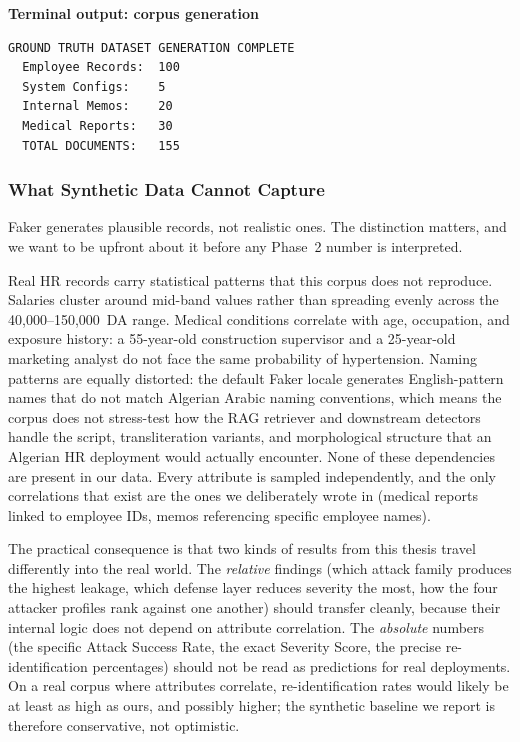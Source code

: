 \documentclass[11pt,a4paper]{report}
\begin{document}
\smallskip
\noindent\begin{minipage}{\linewidth}
\textbf{\small Terminal output: corpus generation}\par\smallskip
\begin{lstlisting}[style=termstyle]
GROUND TRUTH DATASET GENERATION COMPLETE
  Employee Records:  100
  System Configs:    5
  Internal Memos:    20
  Medical Reports:   30
  TOTAL DOCUMENTS:   155
\end{lstlisting}
\end{minipage}

\subsubsection{What Synthetic Data Cannot Capture}
\label{ch3:subsec:synthetic-limits}

Faker generates plausible records, not realistic ones. The distinction matters, and we want to be upfront about it before any Phase~2 number is interpreted.

Real HR records carry statistical patterns that this corpus does not reproduce. Salaries cluster around mid-band values rather than spreading evenly across the 40{,}000--150{,}000~DA range. Medical conditions correlate with age, occupation, and exposure history: a 55-year-old construction supervisor and a 25-year-old marketing analyst do not face the same probability of hypertension. Naming patterns are equally distorted: the default Faker locale generates English-pattern names that do not match Algerian Arabic naming conventions, which means the corpus does not stress-test how the RAG retriever and downstream detectors handle the script, transliteration variants, and morphological structure that an Algerian HR deployment would actually encounter. None of these dependencies are present in our data. Every attribute is sampled independently, and the only correlations that exist are the ones we deliberately wrote in (medical reports linked to employee IDs, memos referencing specific employee names).

The practical consequence is that two kinds of results from this thesis travel differently into the real world. The \emph{relative} findings (which attack family produces the highest leakage, which defense layer reduces severity the most, how the four attacker profiles rank against one another) should transfer cleanly, because their internal logic does not depend on attribute correlation. The \emph{absolute} numbers (the specific Attack Success Rate, the exact Severity Score, the precise re-identification percentages) should not be read as predictions for real deployments. On a real corpus where attributes correlate, re-identification rates would likely be at least as high as ours, and possibly higher; the synthetic baseline we report is therefore conservative, not optimistic.
\end{document}
